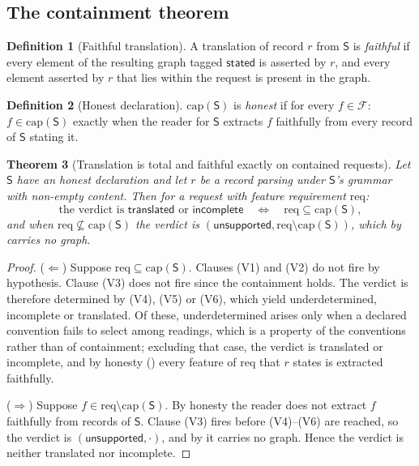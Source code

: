 \documentclass[11pt,twocolumn,a4paper]{article}
\theoremstyle{msthm}
\newtheorem{theorem}{Theorem}[section]
\theoremstyle{definition}
\newtheorem{definition}[theorem]{Definition}
\theoremstyle{remark}
\newcommand{\Src}{\mathsf{S}}
\newcommand{\Feat}{\mathcal{F}}
\newcommand{\Capset}{\mathrm{cap}}
\newcommand{\Req}{\mathrm{req}}
\newcommand{\stated}{\textsf{stated}}
\begin{document}
\subsection{The containment theorem}

\begin{definition}[Faithful translation]
\label{def:faithful}
A translation of record $r$ from $\Src$ is \emph{faithful} if every
element of the resulting graph tagged $\stated$ is asserted by $r$, and
every element asserted by $r$ that lies within the request is present in
the graph.
\end{definition}

\begin{definition}[Honest declaration]
\label{def:honest}
$\Capset(\Src)$ is \emph{honest} if for every $f\in\Feat$: $f\in\Capset(\Src)$
exactly when the reader for $\Src$ extracts $f$ faithfully from every
record of $\Src$ stating it.
\end{definition}

\begin{theorem}[Translation is total and faithful exactly on contained
requests]
\label{thm:capability}
Let $\Src$ have an honest declaration and let $r$ be a record parsing
under $\Src$'s grammar with non-empty content. Then for a request with
feature requirement $\Req$:
\[
\text{the verdict is }\textsf{translated}\text{ or }\textsf{incomplete}
\quad\Longleftrightarrow\quad \Req\subseteq\Capset(\Src),
\]
and when $\Req\not\subseteq\Capset(\Src)$ the verdict is
$(\textsf{unsupported},\Req\setminus\Capset(\Src))$, which by
 carries no graph.
\end{theorem}

\begin{proof}
($\Leftarrow$) Suppose $\Req\subseteq\Capset(\Src)$. Clauses (V1) and (V2)
do not fire by hypothesis. Clause (V3) does not fire since the
containment holds. The verdict is therefore determined by (V4), (V5) or
(V6), which yield \textsf{underdetermined}, \textsf{incomplete} or
\textsf{translated}. Of these, \textsf{underdetermined} arises only when
a declared convention fails to select among readings, which is a
property of the conventions rather than of containment; excluding that
case, the verdict is \textsf{translated} or \textsf{incomplete}, and by
honesty () every feature of $\Req$ that $r$ states is
extracted faithfully.

($\Rightarrow$) Suppose $f\in\Req\setminus\Capset(\Src)$. By honesty the
reader does not extract $f$ faithfully from records of $\Src$. Clause
(V3) fires before (V4)--(V6) are reached, so the verdict is
$(\textsf{unsupported},\cdot)$, and by  it carries
no graph. Hence the verdict is neither \textsf{translated} nor
\textsf{incomplete}.
\end{proof}
\end{document}
